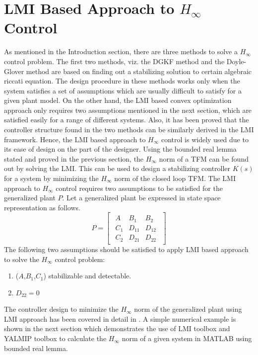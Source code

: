 \documentclass[a4paper,12pt]{article}
\begin{document}
\section{LMI Based Approach to $H_{\infty}$ Control}
\label{h}
As mentioned in the Introduction section, there are three methods to solve a $H_{\infty}$ control problem. The first two methods, viz. the DGKF method and the Doyle-Glover method are based on finding out a stabilizing solution to certain algebraic riccati equation. The design procedure in these methods works only when the system satisfies a set of assumptions which are usually difficult to satisfy for a given plant model. On the other hand, the LMI based convex optimization approach only requires two assumptions mentioned in the next section, which are satisfied easily for a range of different systems. Also, it has been proved that  the controller structure found in the two methods can be similarly derived in the LMI framework. Hence, the LMI based approach to $H_{\infty}$ control is widely used due to its ease of design on the part of the designer.
	Using the bounded real lemma stated and proved in the previous section, the $H_{\infty}$ norm of a TFM can be found out by solving the LMI. This can be used to design a stabilizing controller $K(s)$ for a system by minimizing the $H_{\infty}$ norm of the closed loop TFM. The LMI approach to $H_{\infty}$ control requires two assumptions to be satisfied for the generalized plant $P$. Let a generalized plant be expressed in state space representation as follows.
	\[
	P=\begin{bmatrix}
	\begin{array}{c|cc}
	A & B_{1} & B_{2}\\ \hline
	C_{1} & D_{11} & D_{12} \\ 
	C_{2} & D_{21} & D_{22}	
	\end{array}
	\end{bmatrix}
	\]
	The following two assumptions should be satisfied to apply LMI based approach to solve the $H_{\infty}$ control problem:
	\begin{enumerate}
		\item ($A$,$B_{1}$,$C_{1}$) stabilizable and detectable.
		\item $D_{22} = 0$
	\end{enumerate}
	The controller design to minimize the $H_{\infty}$ norm of the generalized plant using LMI approach has been covered in detail in \cite{Pasca}. A simple numerical example is shown in the next section which demonstrates the use of LMI toolbox and YALMIP toolbox to calculate the $H_{\infty}$ norm of a given system in MATLAB using bounded real lemma. 
\end{document}
